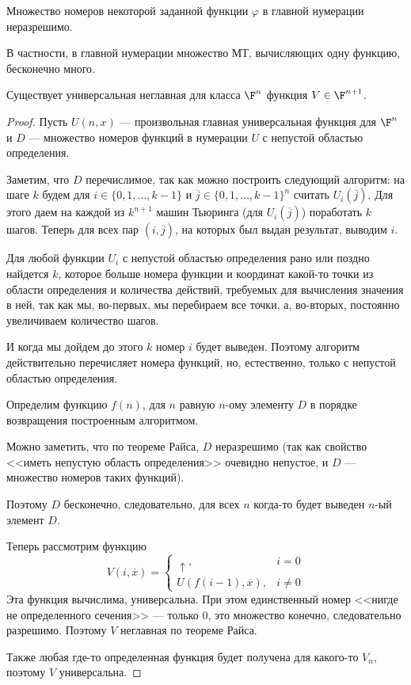 \begin{cor}\label{cor:4}
    Множество номеров некоторой заданной функции $ \varphi $ в главной нумерации неразрешимо.

	В частности, в главной нумерации множество МТ, вычисляющих одну функцию, бесконечно много.
\end{cor}

\begin{cor}\label{cor:5}
	Существует универсальная неглавная для класса $ \F^{n}$ функция $ V \in \F^{n+1}$.
\end{cor}
\begin{proof}
	Пусть $ U(n, x)$ --- произвольная главная универсальная функция для $ \F^{n}$ и $ D$ --- множество номеров функций в нумерации $ U$ с непустой областью определения. 

	\vspace{1em}
	Заметим, что $ D$ перечислимое, так как можно построить следующий алгоритм: 
	на шаге $ k$ будем для $ i \in \{0, 1, \ldots , k-1\}$ и $ \overline{j} \in \{0, 1, \ldots, k-1\}^{n}$
	считать $ U_{i}(\overline{j})$.
	Для этого даем на каждой из $ k^{n+1}$ машин Тьюринга (для $ U_i(\overline{j})$) поработать $ k$ шагов.
	Теперь для всех пар $ (i, \overline{j})$, на которых был выдан результат, выводим $ i$.

	Для любой функции  $ U_i$ с непустой областью определения рано или поздно найдется $ k$, которое больше номера функции и координат какой-то точки из области определения и количества действий, требуемых для вычисления значения в ней, так как мы, во-первых, мы перебираем все точки, а, во-вторых, постоянно увеличиваем количество шагов.

	И когда мы дойдем до этого $ k$ номер $ i$ будет выведен. Поэтому алгоритм действительно перечисляет номера функций, но, естественно, только с непустой областью определения.
	\vspace{1em}

	Определим функцию $ f(n)$, для  $ n$ равную $ n$-ому элементу $ D$ в порядке возвращения построенным алгоритмом. 

	Можно заметить, что по теореме Райса, $ D$ неразрешимо (так как свойство <<иметь непустую область определения>> очевидно непустое, и $ D$ --- множество номеров таких функций).

	Поэтому $ D$ бесконечно, следовательно, для всех $ n$ когда-то будет выведен  $ n $-ый элемент $ D$.

	Теперь рассмотрим функцию
	\[
		V(i, \overline{x}) = \begin{cases}
			\uparrow, & i = 0 \\
			U(f(i-1), \overline{x}), & i \ne 0
		\end{cases}
	\] 
 	Эта функция вычислима, универсальна. При этом единственный номер <<нигде не определенного сечения>> --- только $ 0$, это множество конечно, следовательно разрешимо. Поэтому $ V$ неглавная по теореме Райса.

	Также любая где-то определенная функция будет получена для какого-то $ V_n$, поэтому  $ V$ универсальна.
\end{proof}
